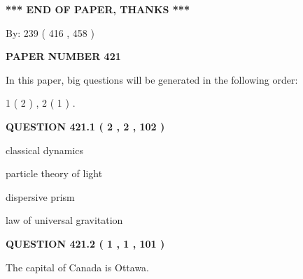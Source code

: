 \documentclass[12pt]{article}
\begin{document}
 
   
   
\vspace{1.0in} 
{\textbf{\large{ *** END OF PAPER, THANKS *** }}} 
   
   
\hspace{1.0in} By: 
 239 ( 416 ,  458 )
   
   
   
   
\newpage 
\setcounter{page}{ 
   421001 } 
   
   
   
   
 {\textbf{ \Large{ PAPER NUMBER  421  }}}
   
   
\vspace{0.2in}
   
   
   
   
   
\vspace{0.2in}
   
In this paper, big questions will be generated in the following order: 
   
   
   1 ( 2 )
 ,
   2 ( 1 )
 .
  
\vspace{0.2in}
  
{\textbf{\Large{QUESTION
421.1 
 ( 2 , 2 , 102 )
}}}
  
  
 
 
\noindent{}
 
 
classical dynamics
 
 
particle theory of light
 
 
dispersive prism
 
 
law of universal gravitation
 
 
 
 
  
\vspace{0.2in}
  
{\textbf{\Large{QUESTION
421.2 
 ( 1 , 1 , 101 )
}}}
  
  
 
 
\noindent{}
 
 
The capital of Canada is Ottawa.
 
\end{document}
